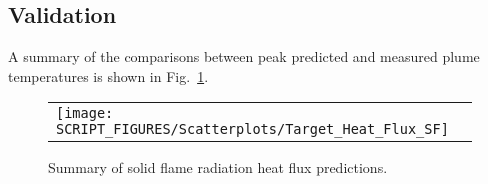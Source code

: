 \clearpage


\subsection*{Validation}

A summary of the comparisons between peak predicted and measured plume temperatures is shown in Fig.~\ref{Target Heat Flux (Solid Flame)}.

\begin{figure}[!ht]
\begin{center}
\begin{tabular}{l}
\texttt{[image: SCRIPT\_FIGURES/Scatterplots/Target\_Heat\_Flux\_SF]}
\end{tabular}
\end{center}
\caption[Summary of solid flame radiation heat flux predictions]
{Summary of solid flame radiation heat flux predictions.}
\label{Target Heat Flux (Solid Flame)}
\end{figure}
